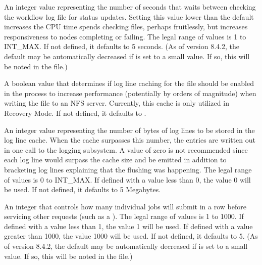 \begin{description}

\label{param:DAGManUserLogScanInterval}
\item[\Macro{DAGMAN\_USER\_LOG\_SCAN\_INTERVAL}]
  An integer value representing the number of seconds that 
   waits between checking the workflow log file for
  status updates.
  Setting this value lower than the default increases the CPU
  time  spends checking files, perhaps fruitlessly, but
  increases responsiveness to nodes completing or failing.
  The legal range of values is 1 to INT\_MAX.
  If not defined, it defaults to 5 seconds.
  (As of version 8.4.2, the default may be automatically decreased if
   is set to a small value.  If so,
  this will be noted in the  file.)

\label{param:DAGManDebugCacheEnable}
\item[\Macro{DAGMAN\_DEBUG\_CACHE\_ENABLE}]
  A boolean value that determines if log line caching for the 
  file should be enabled in the  process to increase
  performance (potentially by orders of magnitude) when writing the
   file to an NFS server. 
  Currently, this cache is only utilized in Recovery Mode.  
  If not defined, it defaults to .

\label{param:DAGManDebugCacheSize}
\item[\Macro{DAGMAN\_DEBUG\_CACHE\_SIZE}]
  An integer value representing the number of bytes of log lines to
  be stored in the log line cache. When the cache surpasses this number,
  the entries are written out in one call to the logging subsystem. A value of
  zero is not recommended since each log line would surpass the cache size 
  and be emitted in addition to bracketing log lines explaining that the 
  flushing was happening.
  The legal range of values is 0 to INT\_MAX.
  If defined with a value less than 0, the  value 0 will be used.
  If not defined, it defaults to 5 Megabytes.

\label{param:DAGManMaxSubmitsPerInterval}
\item[\Macro{DAGMAN\_MAX\_SUBMITS\_PER\_INTERVAL}]
  An integer that controls how many individual jobs
   will submit in a row
  before servicing other requests (such as a ).
  The legal range of values is 1 to 1000.
  If defined with a value less than 1, the  value 1 will be used.
  If defined with a value greater than 1000, the value 1000 will be used.
  If not defined, it defaults to 5.
  (As of version 8.4.2, the default may be automatically decreased if
   is set to a small value.  If so,
  this will be noted in the  file.)


\end{description}
